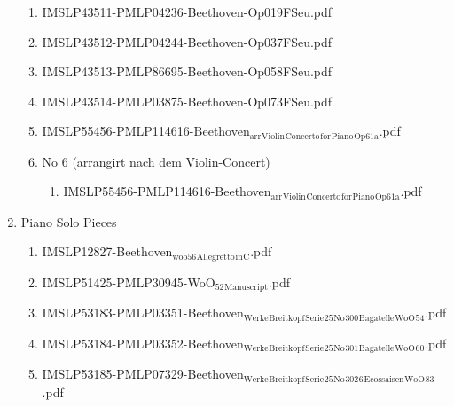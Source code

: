 \documentclass[11pt]{article}
\begin{document}
\begin{enumerate}
\begin{enumerate}
\item IMSLP43511-PMLP04236-Beethoven-Op019FSeu.pdf
\label{sec-1-1-1-1-44-9-5-3}

\item IMSLP43512-PMLP04244-Beethoven-Op037FSeu.pdf
\label{sec-1-1-1-1-44-9-5-4}

\item IMSLP43513-PMLP86695-Beethoven-Op058FSeu.pdf
\label{sec-1-1-1-1-44-9-5-5}

\item IMSLP43514-PMLP03875-Beethoven-Op073FSeu.pdf
\label{sec-1-1-1-1-44-9-5-6}

\item IMSLP55456-PMLP114616-Beethoven$_{\text{arr}}$$_{\text{Violin}}$$_{\text{Concerto}}$$_{\text{for}}$$_{\text{Piano}}$$_{\text{Op61a}}$.pdf
\label{sec-1-1-1-1-44-9-5-7}

\item No 6 (arrangirt nach dem Violin-Concert)
\label{sec-1-1-1-1-44-9-5-8}
\begin{enumerate}
\item IMSLP55456-PMLP114616-Beethoven$_{\text{arr}}$$_{\text{Violin}}$$_{\text{Concerto}}$$_{\text{for}}$$_{\text{Piano}}$$_{\text{Op61a}}$.pdf
\label{sec-1-1-1-1-44-9-5-8-1}
\end{enumerate}
\end{enumerate}

\item Piano Solo Pieces
\label{sec-1-1-1-1-44-9-6}
\begin{enumerate}
\item IMSLP12827-Beethoven$_{\text{woo56}}$$_{\text{Allegretto}}$$_{\text{in}}$$_{\text{C}}$.pdf
\label{sec-1-1-1-1-44-9-6-1}

\item IMSLP51425-PMLP30945-WoO$_{\text{52}}$$_{\text{Manuscript}}$.pdf
\label{sec-1-1-1-1-44-9-6-2}

\item IMSLP53183-PMLP03351-Beethoven$_{\text{Werke}}$$_{\text{Breitkopf}}$$_{\text{Serie}}$$_{\text{25}}$$_{\text{No}}$$_{\text{300}}$$_{\text{Bagatelle}}$$_{\text{WoO}}$$_{\text{54}}$.pdf
\label{sec-1-1-1-1-44-9-6-3}

\item IMSLP53184-PMLP03352-Beethoven$_{\text{Werke}}$$_{\text{Breitkopf}}$$_{\text{Serie}}$$_{\text{25}}$$_{\text{No}}$$_{\text{301}}$$_{\text{Bagatelle}}$$_{\text{WoO}}$$_{\text{60}}$.pdf
\label{sec-1-1-1-1-44-9-6-4}

\item IMSLP53185-PMLP07329-Beethoven$_{\text{Werke}}$$_{\text{Breitkopf}}$$_{\text{Serie}}$$_{\text{25}}$$_{\text{No}}$$_{\text{302}}$$_{\text{6}}$$_{\text{Ecossaisen}}$$_{\text{WoO}}$$_{\text{83}}$.pdf
\label{sec-1-1-1-1-44-9-6-5}


\end{enumerate}
\end{enumerate}
\end{document}
